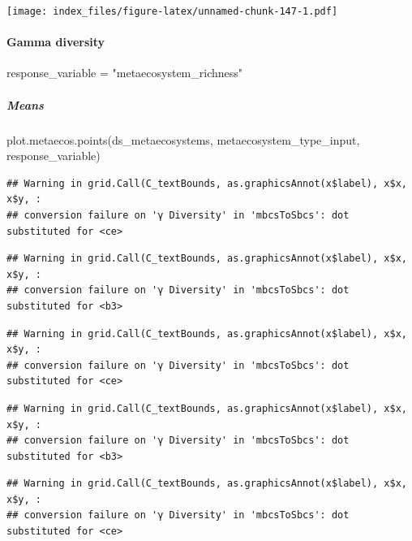 \documentclass[
]{article}
\newenvironment{Shaded}{\begin{snugshade}}{\end{snugshade}}
\newcommand{\FunctionTok}[1]{\textcolor[rgb]{0.00,0.00,0.00}{#1}}
\newcommand{\NormalTok}[1]{#1}
\newcommand{\OtherTok}[1]{\textcolor[rgb]{0.56,0.35,0.01}{#1}}
\newcommand{\StringTok}[1]{\textcolor[rgb]{0.31,0.60,0.02}{#1}}
\begin{document}
\texttt{[image: index\_files/figure-latex/unnamed-chunk-147-1.pdf]}

\hypertarget{gamma-diversity}{%
\paragraph{Gamma diversity}\label{gamma-diversity}}

\begin{Shaded}
\begin{Highlighting}[]
\NormalTok{response\_variable }\OtherTok{=} \StringTok{"metaecosystem\_richness"}
\end{Highlighting}
\end{Shaded}

\hypertarget{means-3}{%
\subparagraph{Means}\label{means-3}}

\begin{Shaded}
\begin{Highlighting}[]
\FunctionTok{plot.metaecos.points}\NormalTok{(ds\_metaecosystems, metaecosystem\_type\_input,}
\NormalTok{                     response\_variable)}
\end{Highlighting}
\end{Shaded}

\begin{verbatim}
## Warning in grid.Call(C_textBounds, as.graphicsAnnot(x$label), x$x, x$y, :
## conversion failure on 'γ Diversity' in 'mbcsToSbcs': dot substituted for <ce>
\end{verbatim}

\begin{verbatim}
## Warning in grid.Call(C_textBounds, as.graphicsAnnot(x$label), x$x, x$y, :
## conversion failure on 'γ Diversity' in 'mbcsToSbcs': dot substituted for <b3>
\end{verbatim}

\begin{verbatim}
## Warning in grid.Call(C_textBounds, as.graphicsAnnot(x$label), x$x, x$y, :
## conversion failure on 'γ Diversity' in 'mbcsToSbcs': dot substituted for <ce>
\end{verbatim}

\begin{verbatim}
## Warning in grid.Call(C_textBounds, as.graphicsAnnot(x$label), x$x, x$y, :
## conversion failure on 'γ Diversity' in 'mbcsToSbcs': dot substituted for <b3>
\end{verbatim}

\begin{verbatim}
## Warning in grid.Call(C_textBounds, as.graphicsAnnot(x$label), x$x, x$y, :
## conversion failure on 'γ Diversity' in 'mbcsToSbcs': dot substituted for <ce>
\end{verbatim}
\end{document}
